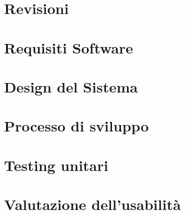 \documentclass[a4paper,12pt]{report}
\begin{document}
\tableofcontents %



\chapter{Revisioni}


\chapter{Requisiti Software}


\chapter{Design del Sistema}






\chapter{Processo di sviluppo}


\chapter{Testing unitari}


\chapter{Valutazione dell'usabilità}



\end{document}
